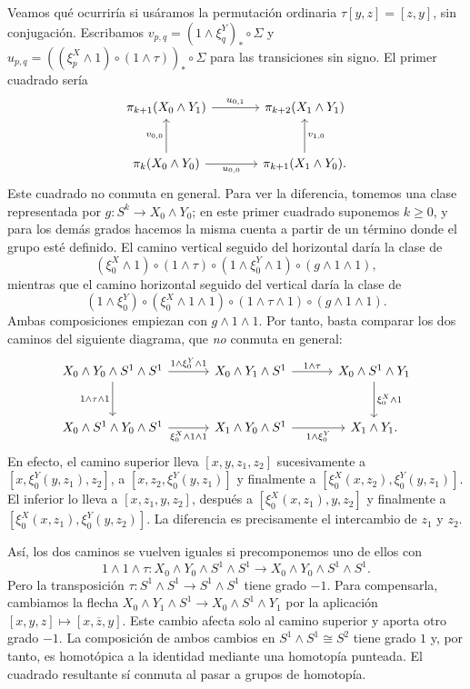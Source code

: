 Veamos qué ocurriría si usáramos la permutación ordinaria $\tau[y,z]=[z,y]$, sin conjugación. Escribamos $v_{p,q}=(1\wedge\xi_q^Y)_*\circ\Sigma$ y $u_{p,q}=((\xi_p^X\wedge1)\circ(1\wedge\tau))_*\circ\Sigma$ para las transiciones sin signo. El primer cuadrado sería
\[
\begin{tikzcd}[column sep=large,row sep=large]
\pi_{k+1}(X_0\wedge Y_1) \arrow[r,"u_{0,1}"]
& \pi_{k+2}(X_1\wedge Y_1)\\
\pi_k(X_0\wedge Y_0) \arrow[u,"v_{0,0}"] \arrow[r,"u_{0,0}"']
& \pi_{k+1}(X_1\wedge Y_0) \arrow[u,"v_{1,0}"'].
\end{tikzcd}
\]
Este cuadrado no conmuta en general. Para ver la diferencia, tomemos una clase representada por $g\colon S^k\to X_0\wedge Y_0$; en este primer cuadrado suponemos $k\ge0$, y para los demás grados hacemos la misma cuenta a partir de un término donde el grupo esté definido. El camino vertical seguido del horizontal daría la clase de
\[
(\xi^X_0\wedge1)\circ(1\wedge\tau)
\circ(1\wedge\xi^Y_0\wedge1)\circ(g\wedge1\wedge1),
\]
mientras que el camino horizontal seguido del vertical daría la clase de
\[
(1\wedge\xi^Y_0)\circ(\xi^X_0\wedge1\wedge1)
\circ(1\wedge\tau\wedge1)\circ(g\wedge1\wedge1).
\]
Ambas composiciones empiezan con $g\wedge1\wedge1$. Por tanto, basta comparar los dos caminos del siguiente diagrama, que \emph{no} conmuta en general:
\[
\begin{tikzcd}[column sep=3.2em,row sep=large]
X_0\wedge Y_0\wedge S^1\wedge S^1
\arrow[r,"1\wedge\xi^Y_0\wedge1"] \arrow[d,"1\wedge\tau\wedge1"']
& X_0\wedge Y_1\wedge S^1 \arrow[r,"1\wedge\tau"]
& X_0\wedge S^1\wedge Y_1 \arrow[d,"\xi^X_0\wedge1"]\\
X_0\wedge S^1\wedge Y_0\wedge S^1
\arrow[r,"\xi^X_0\wedge1\wedge1"']
& X_1\wedge Y_0\wedge S^1 \arrow[r,"1\wedge\xi^Y_0"']
& X_1\wedge Y_1.
\end{tikzcd}
\]
En efecto, el camino superior lleva $[x,y,z_1,z_2]$ sucesivamente a $[x,\xi^Y_0(y,z_1),z_2]$, a $[x,z_2,\xi^Y_0(y,z_1)]$ y finalmente a $[\xi^X_0(x,z_2),\xi^Y_0(y,z_1)]$. El inferior lo lleva a $[x,z_1,y,z_2]$, después a $[\xi^X_0(x,z_1),y,z_2]$ y finalmente a $[\xi^X_0(x,z_1),\xi^Y_0(y,z_2)]$. La diferencia es precisamente el intercambio de $z_1$ y $z_2$.

Así, los dos caminos se vuelven iguales si precomponemos uno de ellos con
\[
1\wedge1\wedge\tau\colon
X_0\wedge Y_0\wedge S^1\wedge S^1
\longrightarrow X_0\wedge Y_0\wedge S^1\wedge S^1.
\]
Pero la transposición $\tau\colon S^1\wedge S^1\to S^1\wedge S^1$ tiene grado $-1$. Para compensarla, cambiamos la flecha $X_0\wedge Y_1\wedge S^1\to X_0\wedge S^1\wedge Y_1$ por la aplicación $[x,y,z]\mapsto[x,\overline z,y]$. Este cambio afecta solo al camino superior y aporta otro grado $-1$. La composición de ambos cambios en $S^1\wedge S^1\cong S^2$ tiene grado $1$ y, por tanto, es homotópica a la identidad mediante una homotopía punteada. El cuadrado resultante sí conmuta al pasar a grupos de homotopía.

